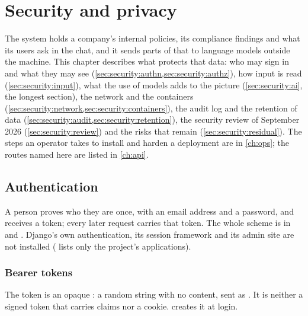 \chapter{Security and privacy}\label{ch:security}

The system holds a company's internal policies, its compliance findings and what its users
ask in the chat, and it sends parts of that to language models outside the machine. This
chapter describes what protects that data: who may sign in and what they may see
(\cref{sec:security:authn,sec:security:authz}), how input is read (\cref{sec:security:input}),
what the use of models adds to the picture (\cref{sec:security:ai}, the longest section), the
network and the containers (\cref{sec:security:network,sec:security:containers}), the audit log
and the retention of data (\cref{sec:security:audit,sec:security:retention}), the security
review of September 2026 (\cref{sec:security:review}) and the risks that remain
(\cref{sec:security:residual}). The steps an operator takes to install and harden a deployment
are in \cref{ch:ops}; the routes named here are listed in \cref{ch:api}.


\section{Authentication}\label{sec:security:authn}

A person proves who they are once, with an email address and a password, and receives a
token; every later request carries that token. The whole scheme is in 
and . Django's own authentication, its session framework and
its admin site are not installed ( lists only the project's applications).

\subsection{Bearer tokens}

The token is an opaque : a random string with no content, sent as
  . It is neither a signed token that carries claims nor a
cookie.  creates it at login.

